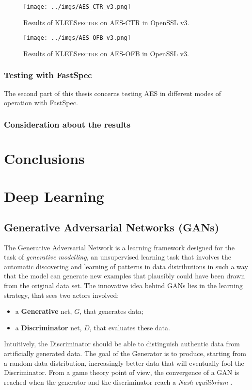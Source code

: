 \documentclass[12pt,a4paper]{book}
\theoremstyle{definition}
\begin{document}
	\begin{figure}[!ht]
		\centering
		\texttt{[image: ../imgs/AES\_CTR\_v3.png]}
		\captionsetup{width=.8\linewidth}
		\caption{Results of \textsc{KLEESpectre} on AES-CTR in OpenSSL v3.}
		\label{fig:result_ctr_v3}
	\end{figure}

	\begin{figure}[!ht]
		\centering
		\texttt{[image: ../imgs/AES\_OFB\_v3.png]}
		\captionsetup{width=.8\linewidth}
		\caption{Results of \textsc{KLEESpectre} on AES-OFB in OpenSSL v3.}
		\label{fig:result_ofb_v3}
	\end{figure}



	\subsection{Testing with FastSpec}
	The second part of this thesis concerns testing AES in different modes of operation with FastSpec.
	
	\subsection{Consideration about the results}
	
	\chapter{Conclusions}
	
	\appendix
	
	\chapter{Deep Learning}\label{appendix:dl}
	\section{Generative Adversarial Networks (GANs)}
	The Generative Adversarial Network \cite{Goodfellow2014} is a learning framework designed for the task of \textit{generative modelling}, an unsupervised learning task that involves the automatic discovering and learning of patterns in data distributions in such a way that the model can generate new examples that plausibly could have been drawn from the original data set. The innovative idea behind GANs lies in the learning strategy, that sees two actors involved:
	\begin{itemize}
		\item a \textbf{Generative} net, $G$, that generates data;
		\item a \textbf{Discriminator} net, $D$, that evaluates these data.
	\end{itemize}
	Intuitively, the Discriminator should be able to distinguish authentic data from artificially generated data. The goal of the Generator is to produce, starting from a random data distribution, increasingly better data that will eventually fool the Discriminator. From a game theory point of view, the convergence of a GAN is reached when the generator and the discriminator reach a \textit{Nash equilibrium} \cite{Ratliff2013}.
\end{document}
